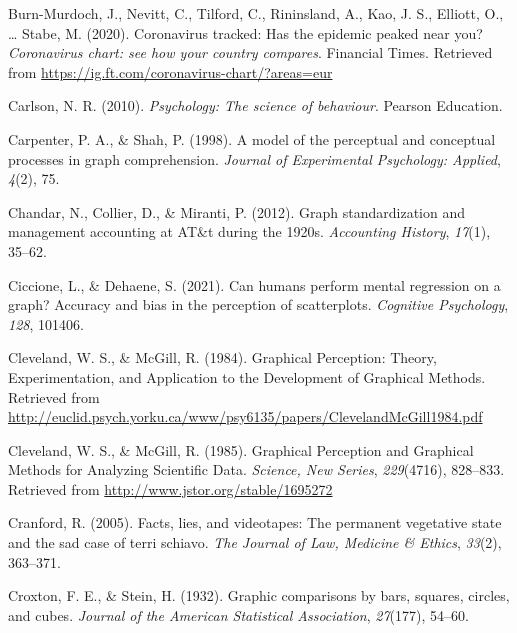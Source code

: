 \documentclass[print]{nuthesis}
\newlength{\cslhangindent}
\newenvironment{CSLReferences}%
{\setlength{\parindent}{0pt}%
\everypar{\setlength{\hangindent}{\cslhangindent}}\ignorespaces}%
{\par}
\begin{document}
\begin{CSLReferences}{1}{0}
\leavevmode{}%
Burn-Murdoch, J., Nevitt, C., Tilford, C., Rininsland, A., Kao, J. S., Elliott, O., \ldots{} Stabe, M. (2020). Coronavirus tracked: Has the epidemic peaked near you? \emph{Coronavirus chart: see how your country compares}. Financial Times. Retrieved from \url{https://ig.ft.com/coronavirus-chart/?areas=eur}

\leavevmode{}%
Carlson, N. R. (2010). \emph{Psychology: The science of behaviour}. Pearson Education.

\leavevmode{}%
Carpenter, P. A., \& Shah, P. (1998). A model of the perceptual and conceptual processes in graph comprehension. \emph{Journal of Experimental Psychology: Applied}, \emph{4}(2), 75.

\leavevmode{}%
Chandar, N., Collier, D., \& Miranti, P. (2012). Graph standardization and management accounting at AT\&t during the 1920s. \emph{Accounting History}, \emph{17}(1), 35--62.

\leavevmode{}%
Ciccione, L., \& Dehaene, S. (2021). Can humans perform mental regression on a graph? Accuracy and bias in the perception of scatterplots. \emph{Cognitive Psychology}, \emph{128}, 101406.

\leavevmode{}%
Cleveland, W. S., \& McGill, R. (1984). Graphical {Perception}: {Theory}, {Experimentation}, and {Application} to the {Development} of {Graphical} {Methods}. Retrieved from \url{http://euclid.psych.yorku.ca/www/psy6135/papers/ClevelandMcGill1984.pdf}

\leavevmode{}%
Cleveland, W. S., \& McGill, R. (1985). Graphical {Perception} and {Graphical} {Methods} for {Analyzing} {Scientific} {Data}. \emph{Science, New Series}, \emph{229}(4716), 828--833. Retrieved from \url{http://www.jstor.org/stable/1695272}

\leavevmode{}%
Cranford, R. (2005). Facts, lies, and videotapes: The permanent vegetative state and the sad case of terri schiavo. \emph{The Journal of Law, Medicine \& Ethics}, \emph{33}(2), 363--371.

\leavevmode{}%
Croxton, F. E., \& Stein, H. (1932). Graphic comparisons by bars, squares, circles, and cubes. \emph{Journal of the American Statistical Association}, \emph{27}(177), 54--60.


\end{CSLReferences}
\end{document}
